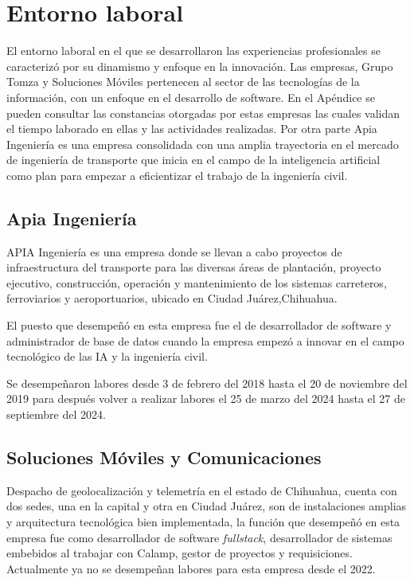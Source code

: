 \documentclass[protocolo.tex]{subfiles}
\begin{document}
\section{Entorno laboral}

El entorno laboral en el que se desarrollaron las experiencias profesionales se caracterizó por su dinamismo y enfoque en la innovación.
Las empresas, Grupo Tomza y Soluciones Móviles pertenecen al sector de las tecnologías de la información, con un enfoque en el desarrollo de software. En el Apéndice se pueden consultar las constancias otorgadas por estas empresas las cuales validan el tiempo laborado en ellas y las actividades realizadas. Por otra parte Apia Ingeniería es una empresa consolidada con una amplia trayectoria en el mercado de ingeniería de transporte que inicia en el campo de la inteligencia artificial como plan para empezar a eficientizar el trabajo de la ingeniería civil.

\subsection{Apia Ingeniería}


APIA Ingeniería es una empresa donde se llevan a cabo proyectos de infraestructura del transporte para las diversas áreas de plantación, proyecto ejecutivo, construcción, operación y mantenimiento de los sistemas carreteros, ferroviarios y aeroportuarios, ubicado en Ciudad Juárez,Chihuahua. \vspace{5mm} 

El puesto que desempeñó en esta empresa fue el de desarrollador de software y administrador de base de datos cuando la empresa empezó a innovar en el campo tecnológico de las IA y la ingeniería civil.

\vspace{5mm} 


Se desempeñaron labores desde 3 de febrero del 2018 hasta el 20 de noviembre del 2019 para después volver a realizar labores el 25 de marzo del 2024 hasta el 27 de septiembre del 2024.

\subsection{Soluciones Móviles y Comunicaciones}
Despacho de geolocalización y telemetría en el estado de Chihuahua, cuenta con dos sedes, una en la capital y otra en Ciudad Juárez, son de instalaciones amplias y arquitectura tecnológica bien implementada, la función que desempeñó en esta empresa fue como desarrollador de software \textit{fullstack}, desarrollador de sistemas embebidos al trabajar con Calamp, gestor de proyectos y requisiciones. Actualmente ya no se desempeñan labores para esta empresa desde el 2022.\vspace{5mm} 
\end{document}
